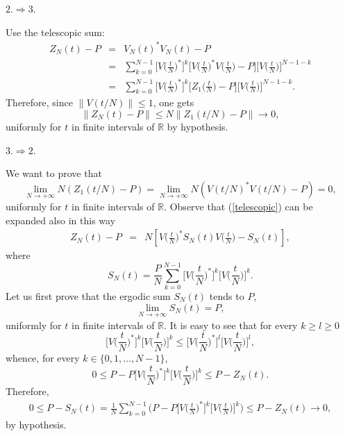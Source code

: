 \documentclass[aip,jmp
]{revtex4}
\newcommand{\RM}{\mathbb{R}}
\theoremstyle{definition}
\begin{document}
$2. \Rightarrow 3.$

Use  the telescopic sum:
\begin{eqnarray}
Z_N(t)-P &=& V_{N}(t)^{*}V_{N}(t)-P
\nonumber \\
                          & = & \sum_{k=0}^{N-1}\Big[V\Big(\frac{t}{N}\Big)^*\Big]^k \Big[V\Big(\frac{t}{N}\Big)^*V\Big(\frac{t}{N}\Big)-P\Big]\Big[V\Big(\frac{t}{N}\Big)\Big]^{N-1-k} \nonumber\\
                          & = & \sum_{k=0}^{N-1}\Big[V\Big(\frac{t}{N}\Big)^*\Big]^k \Big[Z_1\Big(\frac{t}{N}\Big)-P \Big]\Big[V\Big(\frac{t}{N}\Big)\Big]^{N-1-k}.
\label{telescopic}
\end{eqnarray}
Therefore, since $\| V(t/N)\|\leq 1$, one gets
\[
\left\|Z_{N}(t)-P\right\| \leq N \left\|
Z_1(t/N) -P \right\| \to  0 ,
\]
uniformly for $t$ in finite intervals of $\RM$ by hypothesis.

$3. \Rightarrow 2.$

We want to prove that
\begin{equation}\label{deriv2}
\lim_{N \to + \infty} N(Z_1(t/N)-P)=
\lim_{N \to + \infty} N(V(t/N)^* V(t/N)-P)=0,
\end{equation}
uniformly for $t$ in finite intervals of $\RM$. Observe that
(\ref{telescopic}) can be expanded also in this way
\begin{eqnarray}
Z_N(t)-P
&=&  N \left[
V\Big(\frac{t}{N}\Big)^* S_N(t) V\Big(\frac{t}{N}\Big) - S_N(t) \right],
\label{telescopic2}
\end{eqnarray}
where
\begin{equation*}
S_N(t)=\frac{P}{N}\sum_{k=0}^{N-1}\Big[V\Big(\frac{t}{N}\Big)^*\Big]^k \Big[V\Big(\frac{t}{N}\Big)\Big]^k.
\end{equation*}
Let us first prove that the  ergodic sum $S_N(t)$ tends to $P$,
\[
\lim_{N \to +\infty} S_N(t)=P,
\]
uniformly for $t$ in finite intervals of $\RM$.  It is easy to see that
for every $k\geq l\geq 0$
\[
\Big[V\Big(\frac{t}{N}\Big)^*\Big]^k \Big[V\Big(\frac{t}{N}\Big)\Big]^k \leq \Big[V\Big(\frac{t}{N}\Big)^*\Big]^l \Big[V\Big(\frac{t}{N}\Big)\Big]^l ,
\]
whence, for every $k \in \{ 0,1, \ldots, N-1\}$,
\[
0 \leq P- P \Big[V\Big(\frac{t}{N}\Big)^*\Big]^k \Big[V\Big(\frac{t}{N}\Big)\Big]^k \leq P- Z_N(t) .
\]
Therefore,
\begin{eqnarray*}
0 \leq P- S_N(t) =\frac{1}{N} \sum_{k=0}^{N-1}\Big( P- P \Big[V\Big(\frac{t}{N}\Big)^*\Big]^k \Big[V\Big(\frac{t}{N}\Big)\Big]^k\Big) \leq P- Z_N(t) \to 0,
\end{eqnarray*}
by hypothesis.
\end{document}
